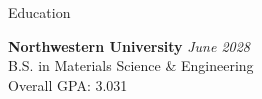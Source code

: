 \documentclass[
	a4paper, %
	10pt, %
]{resume} %
\begin{document}

\begin{rSection}{Education}
	
	\textbf{Northwestern University} \hfill \textit{June 2028} \\ 
	B.S. in Materials Science \& Engineering \\
	Overall GPA: 3.031
	
\end{rSection}

\end{document}
